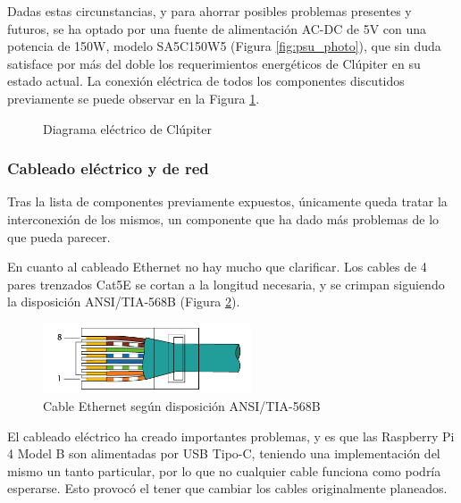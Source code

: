 Dadas estas circunstancias, y para ahorrar posibles problemas presentes y futuros, se ha optado por una fuente de alimentación AC-DC de 5V con una potencia de 150W, modelo SA5C150W5 (Figura \ref{fig:psu_photo}), que sin duda satisface por más del doble los requerimientos energéticos de Clúpiter en su estado actual. La conexión eléctrica de todos los componentes discutidos previamente se puede observar en la Figura \ref{fig:raspi_electric_diagram}.

\begin{figure}[h!]
  \centering
  \vspace*{0.5cm}
  \def\svgwidth{0.9\textwidth}
  
  \caption{Diagrama eléctrico de Clúpiter}
  \label{fig:raspi_electric_diagram}
\end{figure}

\subsubsection{Cableado eléctrico y de red}
\label{sssec:cableado_electrico_red}
Tras la lista de componentes previamente expuestos, únicamente queda tratar la interconexión de los mismos, un componente que ha dado más problemas de lo que pueda parecer.

En cuanto al cableado Ethernet no hay mucho que clarificar. Los cables de 4 pares trenzados Cat5E se cortan a la longitud necesaria, y se crimpan siguiendo la disposición ANSI/TIA-568B (Figura \ref{fig:TIA-568B-horiz}).

\begin{figure}[h!]
  \centering
  \includegraphics[width=0.55\textwidth]{img/TIA-568B-horizontal.png}
  \caption{Cable Ethernet según disposición ANSI/TIA-568B}
  \label{fig:TIA-568B-horiz}
\end{figure}

El cableado eléctrico ha creado importantes problemas, y es que las Raspberry Pi 4 Model B son alimentadas por USB Tipo-C, teniendo una implementación del mismo un tanto particular, por lo que no cualquier cable funciona como podría esperarse. Esto provocó el tener que cambiar los cables originalmente planeados.

